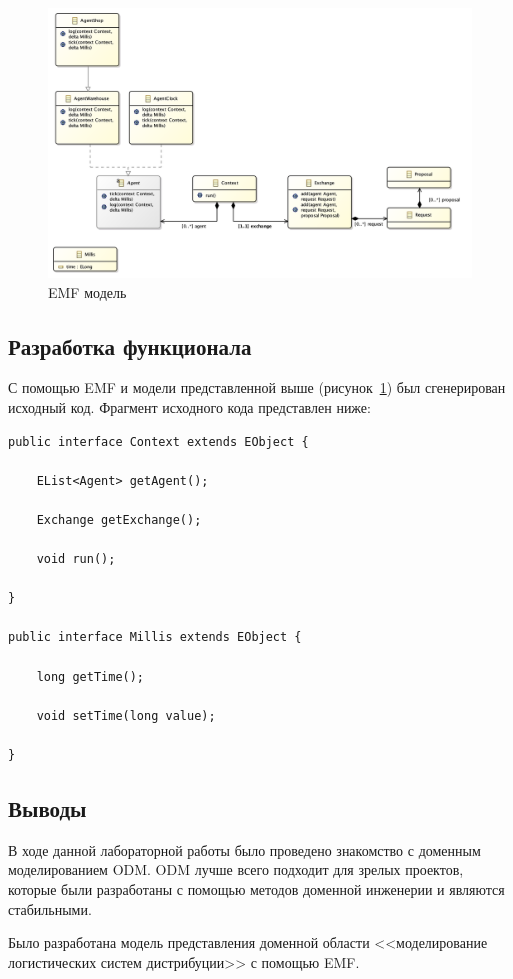 \begin{figure}[H]
    \centering
    \includegraphics[width=\textwidth]{lab1_2}
    \caption{EMF модель}
    \label{fig:model}
\end{figure}

\subsection{Разработка функционала}
С помощью EMF и модели представленной выше (рисунок~\ref{fig:model}) был сгенерирован исходный код. 
Фрагмент исходного кода представлен ниже:
\begin{lstlisting}
public interface Context extends EObject {

	EList<Agent> getAgent();

	Exchange getExchange();

	void run();

} 

public interface Millis extends EObject {

	long getTime();

	void setTime(long value);

}
\end{lstlisting}

\subsection*{Выводы}
В ходе данной лабораторной работы было проведено знакомство с доменным моделированием ODM. ODM лучше всего подходит для зрелых проектов, которые были разработаны с помощью методов доменной инженерии и являются стабильными.

Было разработана модель представления доменной области <<моделирование логистических систем дистрибуции>> с помощью EMF. 


